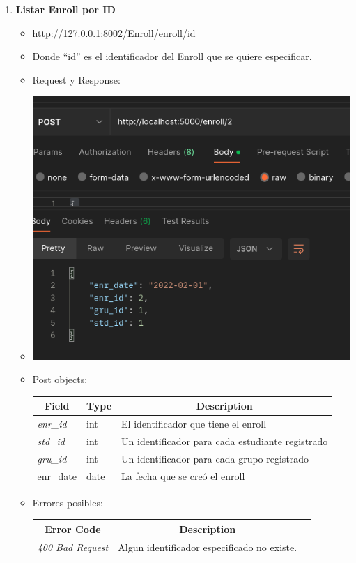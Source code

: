 \documentclass{article}
\begin{document}
\begin{enumerate}
    \item \textbf{Listar Enroll por ID}
    \begin{itemize}
        \item http://127.0.0.1:8002/Enroll/enroll/id
        \item Donde ``id'' es el identificador del Enroll que se quiere
        especificar.
        \item Request y Response:
        \item \includegraphics[scale=.5]{assets/enroll/enroll2.png}
        \item Post objects:
        \begin{table}[H] \centering \begin{tabular}{|l|l|l|} \hline
        \multicolumn{1}{|c|}{\textbf{Field}} &
        \multicolumn{1}{c|}{\textbf{Type}} &
        \multicolumn{1}{c|}{\textbf{Description}} \\ \hline \textit{enr\_id} &
        int & El identificador que tiene el enroll \\ \hline \textit{std\_id} &
        int & Un identificador para cada estudiante registrado \\ \hline
        \textit{gru\_id} & int & Un identificador para cada grupo registrado \\
        \hline enr\_date & date & La fecha que se creó el enroll \\ \hline
        \end{tabular} \end{table}
        \item Errores posibles: \begin{table}[H] \centering
        \begin{tabular}{|c|c|l|} \hline \textbf{Error Code} &
        \textbf{Description} \\ \hline \textit{400 Bad Request} & Algun
        identificador especificado no existe. \\ \hline \end{tabular} \end{table}
    \end{itemize}


\end{enumerate}
\end{document}
